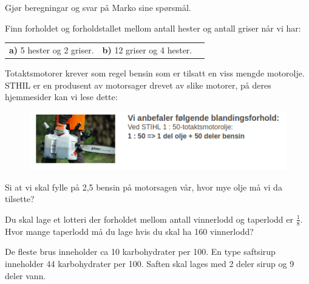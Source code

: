 Gjør beregningar og svar på Marko sine spørsmål.

\nes

 \vs
{}

 \vs
{}

Finn forholdet og forholdstallet mellom antall hester og antall griser når vi har:\os
\begin{tabular}{@{}l l l}	
	\textbf{a)} 5 hester og 2 griser. &\textbf{b)} 12 griser og 4 hester.
\end{tabular}

\newpage
{}
Totaktsmotorer krever som regel bensin som er tilsatt en viss mengde motorolje. STHIL er en produsent av motorsager drevet av slike motorer, på deres hjemmesider kan vi lese dette:
\begin{figure}
	\includegraphics[]{stihl}
\end{figure}
Si at vi skal fylle på 2,5 bensin på motorsagen vår, hvor mye olje må vi da tilsette?

\vsk \vspace{12pt}

Du skal lage et lotteri der forholdet mellom antall vinnerlodd og taperlodd er $ \frac{1}{8} $. Hvor mange taperlodd må du lage hvis du skal ha 160 vinnerlodd?

De fleste brus inneholder ca 10 karbohydrater per 100. En type saftsirup inneholder 44 karbohydrater per 100. Saften skal lages med 2 deler sirup og 9 deler vann. \os

